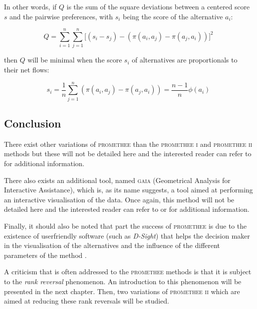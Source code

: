 In other words, if $Q$ is the sum of the square deviations between a centered score $s$ and the pairwise preferences, with $s_i$ being the score of the alternative $a_i$:

\begin{equation}
    Q = \sum\limits_{i=1}^n\sum\limits_{j=1}^n\big[(s_i-s_j) - (\pi(a_i, a_j) - \pi(a_j,a_i))\big]^2
    \label{eqn:square_deviations_sum}
\end{equation}

then $Q$ will be minimal when the score $s_i$ of alternatives are proportionals to their net flows:

\begin{equation}
    s_i = \frac{1}{n}\sum\limits_{j=1}^n (\pi(a_i,a_j)-\pi(a_j,a_i)) = \frac{n-1}{n} \phi(a_i)
    \label{eqn:score_prop_netflow}
\end{equation}

\subsection{Conclusion}

There exist other variations of \textsc{promethee} than the \textsc{promethee i} and \textsc{promethee ii} methods but these will not be detailed here and the interested reader can refer to \cite{Brans2016} for additional information.

There also exists an additional tool, named \textsc{gaia} (Geometrical Analysis for Interactive Assistance), which is, as its name suggests, a tool aimed at performing an interactive visualisation of the data.
Once again, this method will not be detailed here and the interested reader can refer to \cite{Brans2016} or \cite{Bertrand2002} for additional information.

Finally, it should also be noted that part the success of \textsc{promethee} is due to the existence of userfriendly software (such as \textit{D-Sight}) that helps the decision maker in the visualisation of the alternatives and the influence of the different parameters of the method \cite{DeSmet2013}.

A criticism that is often addressed to the \textsc{promethee} methods is that it is subject to the \textit{rank reversal} phenomenon. An introduction to this phenomenon will be presented in the next chapter. Then, two variations of \textsc{promethee ii} which are aimed at reducing these rank reversals will be studied.

